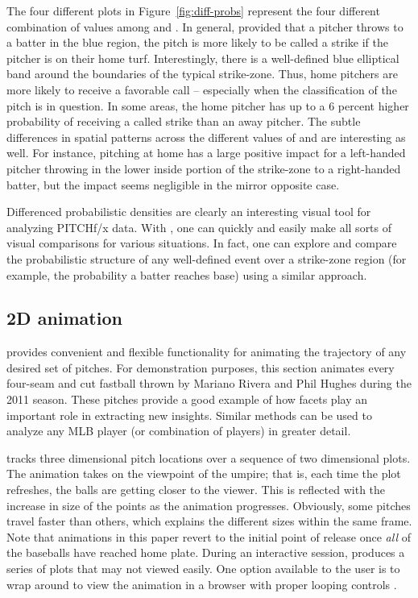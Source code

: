 \documentclass[a4paper]{report}\usepackage[]{graphicx}\usepackage[]{color}
\begin{document}
\begin{article}
The four different plots in Figure~\ref{fig:diff-probs} represent
the four different combination of values among  and
. In general, provided that a pitcher throws to a batter
in the blue region, the pitch is more likely to be called a strike
if the pitcher is on their home turf. Interestingly, there is a well-defined
blue elliptical band around the boundaries of the typical strike-zone.
Thus, home pitchers are more likely to receive a favorable call --
especially when the classification of the pitch is in question. In
some areas, the home pitcher has up to a 6 percent higher probability
of receiving a called strike than an away pitcher. The subtle differences
in spatial patterns across the different values of 
and  are interesting as well. For instance, pitching
at home has a large positive impact for a left-handed pitcher throwing
in the lower inside portion of the strike-zone to a right-handed batter,
but the impact seems negligible in the mirror opposite case.

Differenced probabilistic densities are clearly an interesting visual
tool for analyzing PITCHf/x data. With , one can quickly
and easily make all sorts of visual comparisons for various situations.
In fact, one can explore and compare the probabilistic structure of
any well-defined event over a strike-zone region (for example, the
probability a batter reaches base) using a similar approach. 


\subsection{2D animation}

 provides convenient and flexible functionality for
animating the trajectory of any desired set of pitches. For demonstration
purposes, this section animates every four-seam and cut fastball thrown
by Mariano Rivera and Phil Hughes during the 2011 season. These pitches
provide a good example of how facets play an important role in extracting
new insights. Similar methods can be used to analyze any MLB player
(or combination of players) in greater detail.

 tracks three dimensional pitch locations over a
sequence of two dimensional plots. The animation takes on the viewpoint
of the umpire; that is, each time the plot refreshes, the balls are
getting closer to the viewer. This is reflected with the increase
in size of the points as the animation progresses. Obviously, some
pitches travel faster than others, which explains the different sizes
within the same frame. Note that animations in this paper revert to
the initial point of release once \emph{all} of the baseballs have
reached home plate. During an interactive session, 
produces a series of plots that may not viewed easily. One option
available to the user is to wrap  around
 to view the animation in a browser with proper looping
controls \citep{animation}.


\end{article}
\end{document}
